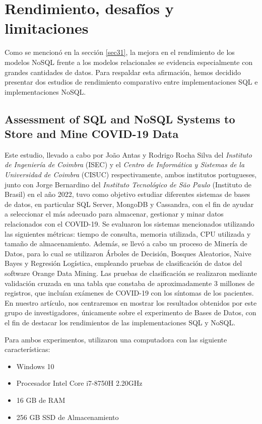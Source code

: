 \documentclass[pdflatex,sn-mathphys-num]{sn-jnl}
\theoremstyle{thmstyleone}%
\theoremstyle{thmstyletwo}%
\theoremstyle{thmstylethree}%
\begin{document}
\section{Rendimiento, desafíos y limitaciones}\label{sec5}

Como se mencionó en la sección \ref{sec31}, la mejora en el rendimiento de los modelos NoSQL frente a los modelos relacionales se evidencia especialmente con grandes cantidades de datos. Para respaldar esta afirmación, hemos decidido presentar dos estudios de rendimiento comparativo entre implementaciones SQL e implementaciones NoSQL.

\subsection{Assessment of SQL and NoSQL Systems to Store and Mine
COVID-19 Data}\label{sec51}

Este estudio\cite{cov-19}, llevado a cabo por João Antas y Rodrigo Rocha Silva del \textit{Instituto de Ingeniería de Coimbra} (ISEC) y el \textit{Centro de Informática y Sistemas de la Universidad de Coimbra} (CISUC) respectivamente, ambos institutos portugueses, junto con Jorge Bernardino del \textit{Instituto Tecnológico de São Paulo} (Instituto de Brasil) en el año 2022, tuvo como objetivo estudiar diferentes sistemas de bases de datos, en particular SQL Server, MongoDB y Cassandra, con el fin de ayudar a seleccionar el más adecuado para almacenar, gestionar y minar datos relacionados con el COVID-19. Se evaluaron los sistemas mencionados utilizando las siguientes métricas: tiempo de consulta, memoria utilizada, CPU utilizada y tamaño de almacenamiento. Además, se llevó a cabo un proceso de Minería de Datos, para lo cual se utilizaron Árboles de Decisión, Bosques Aleatorios, Naive Bayes y Regresión Logística, empleando pruebas de clasificación de datos del software Orange Data Mining. Las pruebas de clasificación se realizaron mediante validación cruzada en una tabla que constaba de aproximadamente 3 millones de registros, que incluían exámenes de COVID-19 con los síntomas de los pacientes. En nuestro artículo, nos centraremos en mostrar los resultados obtenidos por este grupo de investigadores, únicamente sobre el experimento de Bases de Datos, con el fin de destacar los rendimientos de las implementaciones SQL y NoSQL.

Para ambos experimentos, utilizaron una computadora con las siguiente características:

\begin{itemize}
    \item Windows 10
    \item Procesador Intel Core i7-8750H 2.20GHz
    \item 16 GB de RAM
    \item 256 GB SSD de Almacenamiento
\end{itemize}
\end{document}
